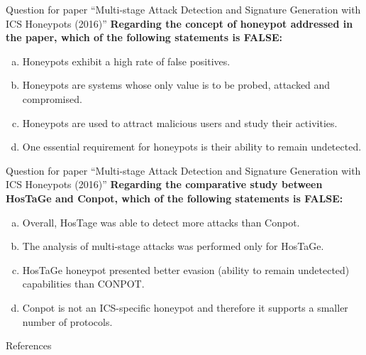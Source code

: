 \documentclass[compress]{beamer}
\begin{document}
\begin{frame}{Question for paper ``Multi-stage Attack Detection and Signature Generation with ICS Honeypots (2016)''}
      \textbf{Regarding the concept of honeypot addressed in the paper, which of the following statements is FALSE:}
      \begin{enumerate}[(a)]
       \item Honeypots exhibit a high rate of false positives.
       \item Honeypots are systems whose only value is to be probed, attacked and compromised.
       \item Honeypots are used to attract malicious users and study their activities.
       \item One essential requirement for honeypots is their ability to remain undetected.
      \end{enumerate}
\end{frame}

\begin{frame}{Question for paper ``Multi-stage Attack Detection and Signature Generation with ICS Honeypots (2016)''}
      \textbf{Regarding the comparative study between HosTaGe and Conpot, which of the following statements is FALSE:}
      \begin{enumerate}[(a)]
       \item Overall, HosTage was able to detect more attacks than Conpot.
       \item The analysis of multi-stage attacks was performed only for HosTaGe.
       \item HosTaGe honeypot presented better evasion (ability to remain undetected) capabilities than CONPOT.
       \item Conpot is not an ICS-specific honeypot and therefore it supports a smaller number of protocols.
      \end{enumerate}
\end{frame}

\begin{frame}[allowframebreaks]{References}\tiny{
\def\newblock{}

}
\end{frame}
\end{document}
